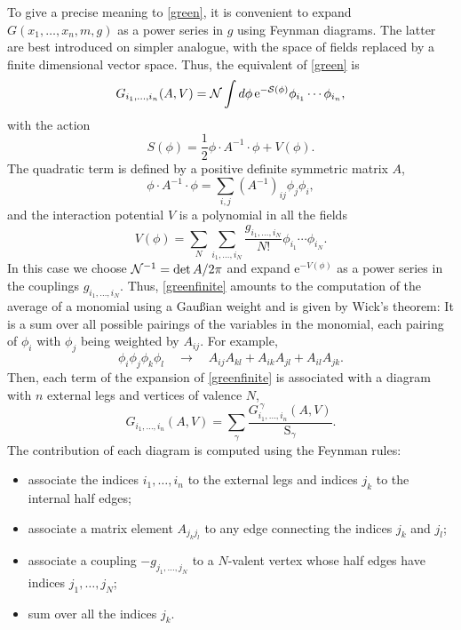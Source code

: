 \documentclass[10pt,here,feynmf]{article}
\begin{document}
To give a precise meaning to \eqref{green}, it is convenient to expand  $G(x_{1},\dots,x_{n},m,g)$ as a power series in $g$ using Feynman diagrams. The latter are best introduced on simpler analogue, with the space of fields replaced by a finite dimensional vector space. Thus, the equivalent of \eqref{green} is
\begin{equation}
G_{i_{1},\dots,i_{n}}(A,V)={\cal N}\int d\phi\,\mathrm{e}^{-\cal{S}(\phi)}\phi_{i_{1}}\cdots\phi_{i_{n}},
\label{greenfinite}
\end{equation}
with the action
\begin{equation}
S(\phi)=\frac{1}{2}\phi\cdot A^{-1}\cdot\phi +V(\phi).
\end{equation}
The quadratic term is defined by a positive definite symmetric matrix $A$,
\begin{equation}
\phi\cdot A^{-1}\!\cdot\phi=\sum_{i,j}(A^{-1})_{ij}\phi_{j}\phi_{i},
\end{equation}
and the interaction potential $V$ is a polynomial in all the fields
\begin{equation}
V(\phi)=\sum_{N}\sum_{i_{1},\dots,i_{N}}\frac{g_{i_{1},\dots,i_{N}}}{N!}\phi_{i_{1}}\cdots\phi_{i_{N}}.
\label{finitepot}
\end{equation}
In this case we choose ${\cal N}^{-1}=\det A/2\pi$ and expand $\mathrm{e}^{-V(\phi)}$ as a power series in the couplings $g_{i_{1},\dots,i_{N}}$. Thus, \eqref{greenfinite} amounts to the computation of the average of a monomial using a Gau\ss ian weight and is given by Wick's theorem: It is a sum over all possible pairings of the variables in the monomial, each pairing of $\phi_{i}$ with $\phi_{j}$ being weighted by $A_{ij}$. For example,
 \begin{equation}
 \phi_{i} \phi_{j} \phi_{k} \phi_{l}\quad\rightarrow\quad
A_{ij}A_{kl}+A_{ik}A_{jl}+A_{il}A_{jk}.
\end{equation}
Then, each term of the expansion of \eqref{greenfinite} is associated with a diagram with $n$ external legs and vertices of valence $N$,
\begin{equation}
G_{i_{1},\dots,i_{n}}(A,V)=\sum_{\gamma}\frac{G^{\,\gamma}_{i_{1},\dots,i_{n}}(A,V)}{\mathrm{S}_{\gamma}}\label{finitediag}.
\end{equation}
The contribution of each diagram is computed using the Feynman rules:
\begin{itemize}
\item
associate the indices $i_{1},\dots,i_{n}$ to the external legs and indices $j_{k}$ to the internal half edges;
\item
associate a matrix element $A_{j_{k}j_{l}}$ to any edge connecting the indices $j_k$ and $j_l$;
\item
associate a coupling $-g_{j_{1},\dots,j_{N}}$ to a $N$-valent vertex  whose half edges have indices $j_{1},\dots,j_{N}$;
\item
sum over all the indices $j_{k}$.
\end{itemize}
\end{document}
